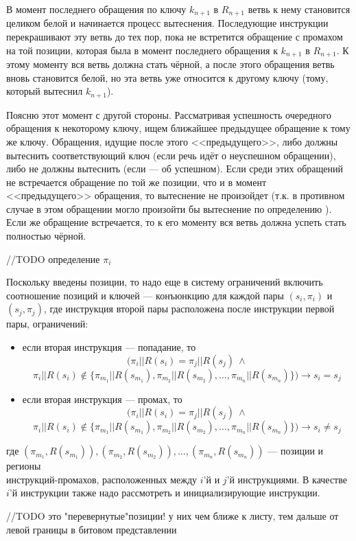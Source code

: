 В момент последнего обращения по ключу $k_{n+1}$ в $R_{n+1}$ ветвь к нему становится целиком белой и начинается процесс вытеснения. Последующие инструкции перекрашивают эту ветвь до тех пор, пока не встретится обращение с промахом на той позиции, которая была в момент последнего обращения к $k_{n+1}$ в $R_{n+1}$. К этому моменту вся ветвь должна стать чёрной, а после этого обращения ветвь вновь становится белой, но эта ветвь уже относится к другому ключу (тому, который вытеснил $k_{n+1}$).

Поясню этот момент с другой стороны. Рассматривая успешность очередного обращения к некоторому ключу, ищем ближайшее предыдущее обращение к тому же ключу. Обращения, идущие после этого <<предыдущего>>, либо должны вытеснить соответствующий ключ (если речь идёт о неуспешном обращении), либо не должны вытеснить (если --- об успешном). Если среди этих обращений не встречается обращение по той же позиции, что и в момент <<предыдущего>> обращения, то вытеснение не произойдет (т.к. в противном случае в этом обращении могло произойти бы вытеснение по определению \PseudoLRU). Если же обращение встречается, то к его моменту вся ветвь должна успеть стать полностью чёрной.

//TODO определение $\pi_i$

Поскольку введены позиции, то надо еще в систему ограничений включить
соотношение позиций и ключей --- конъюнкцию для каждой пары $(s_i,\pi_i)$ и
$(s_j, \pi_j)$, где инструкция второй пары расположена после инструкции первой
пары, ограничений:
\begin{itemize}
    \item если вторая инструкция --- попадание, то $$(\pi_i||R(s_i) =
\pi_j||R(s_j)~\wedge$$ $$\pi_i||R(s_i) \notin \{\pi_{m_1}||R(s_{m_1}),
\pi_{m_2}||R(s_{m_2}), \dots, \pi_{m_n}||R(s_{m_n})\}) \rightarrow s_i = s_j$$
    \item если вторая инструкция --- промах, то $$(\pi_i||R(s_i) =
\pi_j||R(s_j)~\wedge$$ $$\pi_i||R(s_i) \notin \{\pi_{m_1}||R(s_{m_1}),
\pi_{m_2}||R(s_{m_2}), \dots, \pi_{m_n}||R(s_{m_n})\}) \rightarrow s_i \neq
s_j$$
\end{itemize}
где $(\pi_{m_1},R(s_{m_1})), (\pi_{m_2},R(s_{m_2})), \dots,
(\pi_{m_n},R(s_{m_n}))$ --- позиции и регионы\\инструкций-промахов,
расположенных между $i$'й и $j$'й инструкциями. В качестве $i$'й инструкции
также надо рассмотреть и инициализирующие инструкции.

//TODO это "перевернутые"позиции! у них чем ближе к листу, тем дальше от левой границы в битовом представлении


